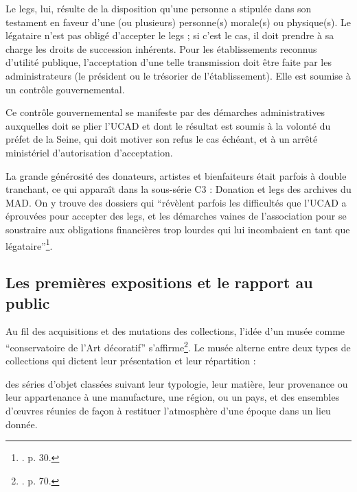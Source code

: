 \noindent
\hspace*{1cm}
\begin{minipage}{\dimexpr\linewidth-2cm}
\fontsize{10}{12}\selectfont
Le legs, lui, résulte de la disposition qu’une personne a stipulée dans son testament en faveur d’une (ou plusieurs) personne(s) morale(s) ou physique(s). Le légataire n’est pas obligé d’accepter le 
legs ; si c’est le cas, il doit prendre à sa charge les droits de succession inhérents. Pour les établissements reconnus d’utilité publique, l’acceptation d’une telle transmission doit être faite par les administrateurs (le président ou le trésorier de l’établissement). Elle est soumise à un contrôle gouvernemental.                                                       \footnotemark{}
\end{minipage}

\vspace{1em}

 Ce contrôle gouvernemental se manifeste par des démarches administratives auxquelles doit se plier l'UCAD et dont le résultat est soumis à la volonté du préfet de la Seine, qui doit motiver son refus le cas échéant, et à un arrêté ministériel d'autorisation d'acceptation.

La grande générosité des donateurs, artistes et bienfaiteurs était parfois à double tranchant, ce qui apparaît dans la sous-série C3 : Donation et legs des archives du MAD. On y trouve des dossiers qui \enquote{révèlent parfois les difficultés que l’UCAD a éprouvées pour accepter des legs, et les démarches vaines de l’association pour se soustraire aux obligations financières trop lourdes qui lui incombaient en tant que légataire}\footnote{\cite{siguret_ir_2001}. p. 30.}.


\subsection{Les premières expositions et le rapport au public}

Au fil des acquisitions et des mutations des collections, l'idée d'un musée comme \enquote{conservatoire de l'Art décoratif} s'affirme\footnote{\cite{brunhammer_beau_1992}. p. 70.}. Le musée alterne entre deux types de collections qui dictent leur présentation et leur répartition : 

\vspace{1em}

\noindent
\hspace*{1cm}
\begin{minipage}{\dimexpr\linewidth-2cm}
\fontsize{10}{12}\selectfont
des séries d'objet classées suivant leur typologie, leur matière, leur provenance ou leur appartenance à une manufacture, une région, ou un pays, et des ensembles d’œuvres réunies de façon à restituer l'atmosphère d'une époque dans un lieu donnée.                                                        \footnotemark{}
\end{minipage}

